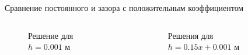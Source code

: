 \documentclass[ignoreonframetext,unicode]{beamer}
\begin{document}
\begin{frame}{Сравнение постоянного и зазора с положительным коэффициентом}
	

	
	\begin{columns}
		
		\begin{figure}[!htbp]
			\caption{Решение для $h = 0.001$ м}
			\label{res_static}
		\end{figure}
		
		\begin{figure}[!htbp]
			\caption{Решения для $h = 0.15 x + 0.001$ м}
			\label{res_pos}
		\end{figure}
	

\end{columns}
\end{frame}
\end{document}

